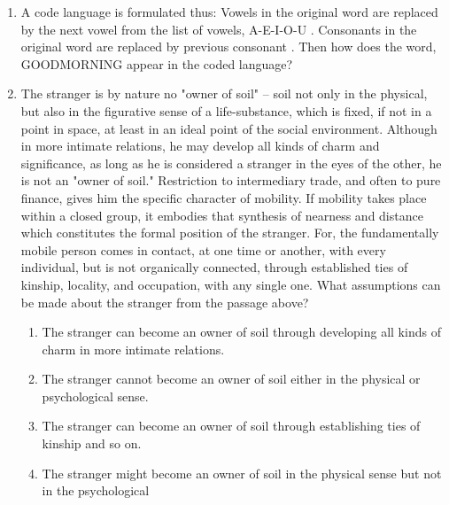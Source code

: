 \documentclass[12pt]{article}
\theoremstyle{remark}
\begin{document}
\begin{enumerate}
\item A code language is formulated thus:
Vowels in the original word are replaced by the next vowel from the list of vowels, A-E-I-O-U . Consonants in the original word are replaced by previous consonant . Then how does the word, GOODMORNING appear in the coded language?
\begin{enumerate}
\end{enumerate}
\hfill{}
\item The stranger is by nature no "owner of soil" -- soil not only in the physical, but also in the figurative sense of a life-substance, which is fixed, if not in a point in space, at least in an ideal point of the social environment. Although in more intimate relations, he may develop all kinds of charm and significance, as long as he is considered a stranger in the eyes of the other, he is not an "owner of soil." Restriction to intermediary trade, and often  to pure finance, gives him the specific character of mobility. If mobility takes place within a closed group, it embodies that synthesis of nearness and distance which constitutes the formal position of the stranger. For, the fundamentally mobile person comes in contact, at one time or another, with every individual, but is not organically connected, through established ties of kinship, locality, and occupation, with any single one. What assumptions can be made about the stranger from the passage above?
\begin{enumerate}
    \item The stranger can become an owner of soil through developing all kinds of charm in more intimate relations.
    \item The stranger cannot become an owner of soil either in the physical or psychological sense.
    \item The stranger can become an owner of soil through establishing ties of kinship and so on.
    \item The stranger might become an owner of soil in the physical sense but not in the psychological

\end{enumerate}
\end{enumerate}
\end{document}
